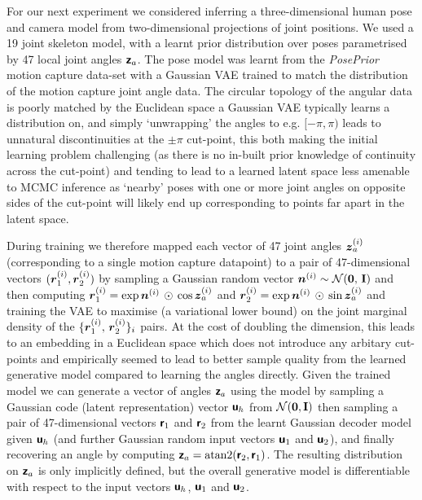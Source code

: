 \begin{figure}[!t]
\label{fig:pose-inference}
\end{figure}

For our next experiment we considered inferring a three-dimensional human pose and camera model from two-dimensional projections of joint positions. We used a 19 joint skeleton model, with a learnt prior distribution over poses parametrised by 47 local joint angles $\boldsymbol{\mathsf{z}}_a$. The pose model was learnt from the \emph{PosePrior} motion capture data-set \citep{akhter2015pose} with a Gaussian \ac{VAE} \citep{kingma2013auto} trained to match the distribution of the motion capture joint angle data. The circular topology of the angular data is poorly matched by the Euclidean space a Gaussian \ac{VAE} typically learns a distribution on, and simply `unwrapping' the angles to e.g. $[-\pi,\pi)$ leads to unnatural discontinuities at the $\pm \pi$ cut-point, this both making the initial learning problem challenging (as there is no in-built prior knowledge of continuity across the cut-point) and tending to lead to a learned latent space less amenable to \ac{MCMC} inference as `nearby' poses with one or more joint angles on opposite sides of the cut-point will likely end up corresponding to points far apart in the latent space.

During training we therefore mapped each vector of 47 joint angles $\boldsymbol{z}_a^{(i)}$ (corresponding to a single motion capture datapoint) to a pair of 47-dimensional vectors $(\boldsymbol{r}_1^{(i)},\boldsymbol{r}_2^{(i)})$ by sampling a Gaussian random vector $\vct{n}^{(i)} \sim \nrm{\vct{0},\,\mathbf{I}}$ and then computing $\boldsymbol{r}_1^{(i)} = \exp\boldsymbol{n}^{(i)}\,\odot\,\cos\boldsymbol{z}_a^{(i)}$ and $ \boldsymbol{r}^{(i)}_2 = \exp\boldsymbol{n}^{(i)}\,\odot\,\sin\boldsymbol{z}^{(i)}_a$ and training the \ac{VAE} to maximise (a variational lower bound) on the joint marginal density of the $\lbrace \boldsymbol{r}^{(i)}_1,\,\boldsymbol{r}^{(i)}_2\rbrace_i$ pairs. At the cost of doubling the dimension, this leads to an embedding in a Euclidean space which does not introduce any arbitary cut-points and empirically seemed to lead to better sample quality from the learned generative model compared to learning the angles directly. Given the trained model we can generate a vector of angles $\boldsymbol{\mathsf{z}}_a$ using the model by sampling a Gaussian code (latent representation) vector $\boldsymbol{\mathsf{u}}_h$ from $\nrm{\vct{0},\mathbf{I}}$ then sampling a pair of 47-dimensional vectors $\boldsymbol{\mathsf{r}}_1$ and $\boldsymbol{\mathsf{r}}_2$ from the learnt Gaussian decoder model given $\boldsymbol{\mathsf{u}}_h$ (and further Gaussian random input vectors $\boldsymbol{\mathsf{u}}_1$ and $\boldsymbol{\mathsf{u}}_2$), and finally recovering an angle by computing $\boldsymbol{\mathsf{z}}_a = \textrm{atan2}(\boldsymbol{\mathsf{r}}_2,\boldsymbol{\mathsf{r}}_1)$. The resulting distribution on $\boldsymbol{\mathsf{z}}_a$ is only implicitly defined, but the overall generative model is differentiable with respect to the input vectors $\boldsymbol{\mathsf{u}}_h$, $\boldsymbol{\mathsf{u}}_1$ and $\boldsymbol{\mathsf{u}}_2$.

